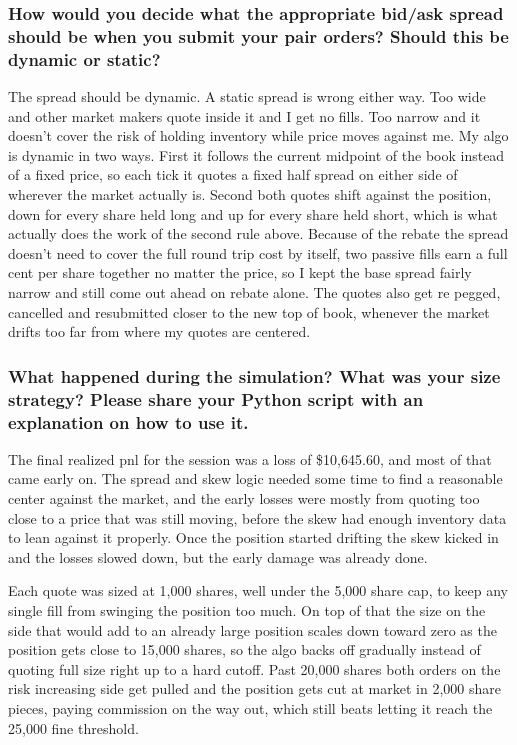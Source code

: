 \documentclass{article}
\begin{document}
\subsubsection{How would you decide what the appropriate bid/ask spread should be when you submit your pair orders? Should this be dynamic or static?}
The spread should be dynamic. A static spread is wrong either way. Too wide and other market makers quote inside it and I get no fills. Too narrow and it doesn’t cover the risk of holding inventory while price moves against me. My algo is dynamic in two ways. First it follows the current midpoint of the book instead of a fixed price, so each tick it quotes a fixed half spread on either side of wherever the market actually is. Second both quotes shift against the position, down for every share held long and up for every share held short, which is what actually does the work of the second rule above. Because of the rebate the spread doesn’t need to cover the full round trip cost by itself, two passive fills earn a full cent per share together no matter the price, so I kept the base spread fairly narrow and still come out ahead on rebate alone. The quotes also get re pegged, cancelled and resubmitted closer to the new top of book, whenever the market drifts too far from where my quotes are centered.

\subsubsection{What happened during the simulation? What was your size strategy? Please share your Python script with an explanation on how to use it.}
The final realized pnl for the session was a loss of \$10,645.60, and most of that came early on. The spread and skew logic needed some time to find a reasonable center against the market, and the early losses were mostly from quoting too close to a price that was still moving, before the skew had enough inventory data to lean against it properly. Once the position started drifting the skew kicked in and the losses slowed down, but the early damage was already done.

Each quote was sized at 1,000 shares, well under the 5,000 share cap, to keep any single fill from swinging the position too much. On top of that the size on the side that would add to an already large position scales down toward zero as the position gets close to 15,000 shares, so the algo backs off gradually instead of quoting full size right up to a hard cutoff. Past 20,000 shares both orders on the risk increasing side get pulled and the position gets cut at market in 2,000 share pieces, paying commission on the way out, which still beats letting it reach the 25,000 fine threshold.
\end{document}
